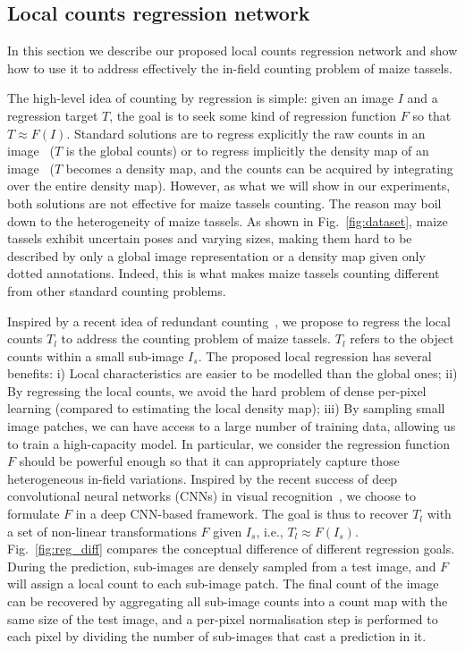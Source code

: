 \documentclass[twocolumn]{bmcart}%
\begin{document}
\subsection*{Local counts regression network}
%
In this section we describe our proposed local counts regression network and show how to use it to address effectively the in-field counting problem of maize tassels.

The high-level idea of counting by regression is simple: given an image $I$ and a regression target $T$, the goal is to seek some kind of regression function $F$ so that $T\approx F(I)$. Standard solutions are to regress explicitly the raw counts in an image~\cite{chan2008privacy} ($T$ is the global counts) or to regress implicitly the density map of an image~\cite{vlaz2010denlearn} ($T$ becomes a density map, and the counts can be acquired by integrating over the entire density map). However, as what we will show in our experiments, both solutions are not effective for maize tassels counting. The reason may boil down to the heterogeneity of maize tassels. As shown in Fig.~\ref{fig:dataset}, maize tassels exhibit uncertain poses and varying sizes, making them hard to be described by only a global image representation or a density map given only dotted annotations. Indeed, this is what makes maize tassels counting different from other standard counting problems.

Inspired by a recent idea of redundant counting~\cite{cohen2017count}, we propose to regress the local counts $T_l$ to address the counting problem of maize tassels. $T_l$ refers to the object counts within a small sub-image $I_s$. The proposed local regression has several benefits: i) Local characteristics are easier to be modelled than the global ones; ii) By regressing the local counts, we avoid the hard problem of dense per-pixel learning (compared to estimating the local density map); iii) By sampling small image patches, we can have access to a large number of training data, allowing us to train a high-capacity model. In particular, we consider the regression function $F$ should be powerful enough so that it can appropriately capture those heterogeneous in-field variations. Inspired by the recent success of deep convolutional neural networks (CNNs) in visual recognition~\cite{Krizhevsky2012,Simonyan14verydeep}, we choose to formulate $F$ in a deep CNN-based framework. The goal is thus to recover $T_l$ with a set of non-linear transformations $F$ given $I_s$, i.e., $T_l\approx F(I_s)$. Fig.~\ref{fig:reg_diff} compares the conceptual difference of different regression goals. During the prediction, sub-images are densely sampled from a test image, and $F$ will assign a local count to each sub-image patch. The final count of the image can be recovered by aggregating all sub-image counts into a count map with the same size of the test image, and a per-pixel normalisation step is performed to each pixel by dividing the number of sub-images that cast a prediction in it.
\end{document}
